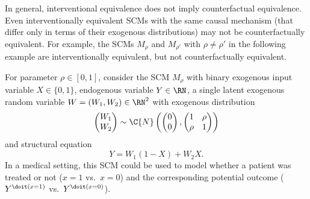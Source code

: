 In general, interventional equivalence does not imply counterfactual equivalence. Even interventionally equivalent SCMs with the same causal mechanism (that differ only in terms of their exogenous distributions) may not be counterfactually equivalent. For example, the SCMs $M_{\rho}$ and $M_{\rho'}$ with $\rho\neq\rho'$ in the following example are interventionally equivalent, but not counterfactually equivalent.
\begin{Eg}\label{ex:Counterfactuals}
  For parameter $\rho\in[0,1]$, consider the SCM $M_\rho$ with binary exogenous input variable $X \in \{0,1\}$, endogenous variable $Y \in \RN$, a single latent exogenous random variable $W = (W_1,W_2) \in \RN^2$ with
exogenous distribution 
  $$\begin{pmatrix} W_1 \\ W_2 \end{pmatrix}\sim\C{N}\left(\begin{pmatrix}0 \\ 0\end{pmatrix},\begin{pmatrix}1&\rho\\ \rho&1\end{pmatrix}\right)$$
and structural equation
  $$Y = W_1 (1 - X) + W_2 X.$$
In a medical setting, this SCM could be used to model whether a patient was treated or not ($x=1$ vs.\ $x=0$) and the corresponding potential outcome ($Y^{\doit(x=1)}$ vs.\ $Y^{\doit(x=0)}$).


\end{Eg}
